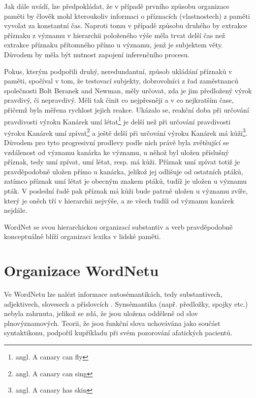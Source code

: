 \documentclass[a4paper, 11pt, oneside]{book}
\newcommand\ex{\textsf}
\begin{document}
				Jak \textcite{collins1969retrieval} dále uvádí, lze předpokládat, že v případě prvního způsobu organizace paměti by člověk mohl kteroukoliv informaci o příznacích (vlastnostech) z paměti vyvolat za konstantní čas. Naproti tomu v případě způsobu druhého by extrakce příznaku z významu v hierarchii položeného výše měla trvat delší čas než extrakce příznaku přítomného přímo u významu, jenž je subjektem věty. Důvodem by měla být nutnost zapojení inferenčního procesu.

				Pokus, kterým podpořili \textcite{collins1969retrieval} druhý, neredundantní, způsob ukládání příznaků v paměti, spočíval v tom, že testovací subjekty, dobrovolníci z řad zaměstnanců společnosti Bolt Beranek and Newman, měly určovat, zda je jim předložený výrok pravdivý, či nepravdivý. Měli tak činit co nejpřesněji a v co nejkratším čase, přičemž byla měřena rychlost jejich reakce. Ukázalo se, reakční doba při určování pravdivosti výroku \ex{Kanárek umí létat}\footnote{angl. \ex{A canary can fly}} je delší než při určování pravdivosti výroku \ex{Kanárek umí zpívat}\footnote{angl. \ex{A canary can sing}} a ještě delší při určování výroku \ex{Kanárek má kůži}\footnote{angl. \ex{A canary has skin}}. Důvodem pro tyto progresivní prodlevy podle nich právě byla zvětšující se vzdálenost od významu \ex{kanárka} ke významu, u něhož byl uložen příslušný příznak, tedy \ex{umí zpívat}, \ex{umí létat}, resp. \ex{má kůži}. Příznak \ex{umí zpívat} totiž je pravděpodobně uložen přímo u \ex{kanárka}, jelikož jej odlišuje od ostatních ptáků, zatímco příznak \ex{umí létat} je obecným znakem ptáků, tudíž je uložen u významu \ex{pták}. V poslední řadě pak příznak \ex{má kůži} bude patrně uložen u významu \ex{zvíře}, který je oněch tří v hierarchii nejvýše, a ze všech tudíž od významu \ex{kanárek} nejdále.

				WordNet se svou hierarchickou organizací substantiv a verb pravděpodobně konceptuálně blíží organizaci lexika v lidské paměti.
			

			\section{Organizace WordNetu}

				Ve WordNetu lze nalézt informace autosémantikách, tedy substantivech, adjektivech, slovesech a příslovcích \parencite{vossen1998introduction}. Synsémantika (např. předložky, spojky etc.) nebyla zahrnuta, jelikož se zdá, že jsou uložena odděleně od slov plnovýznamových. Teorii, že jsou funkční slova uchovávána jako součást syntaktikonu, podpořil kupříkladu \textcite{garrett1982production} při svém pozorování afatických pacientů. 
\end{document}
